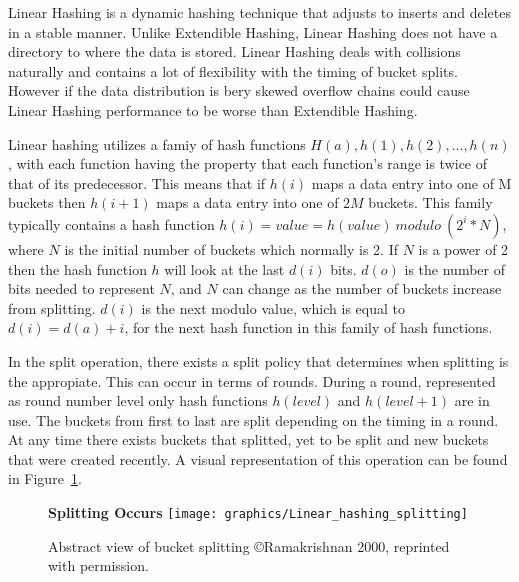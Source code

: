 \documentclass[letterpaper, 12pt]{article}
\begin{document}
Linear Hashing is a dynamic hashing technique that adjusts to inserts and deletes in a stable manner.
Unlike Extendible Hashing, Linear Hashing does not have a directory to where the data is
stored. Linear Hashing deals with collisions naturally and contains a lot of flexibility with
the timing of bucket splits. However if the data distribution is bery skewed overflow chains could cause Linear Hashing performance to be
worse than Extendible Hashing.
\par\vspace{\baselineskip}

Linear hashing utilizes a famiy of hash functions $H(a), h(1), h(2), ... , h(n)$, with each function 
having the property that each function's range is twice of that of its predecessor. This means that 
if $h(i)$ maps a data entry into one of M buckets then $h(i+1)$ maps a data entry into one of $2M$ 
buckets. This family typically contains a hash function $h(i) = value = h(value)\ modulo\ (2^i * N) $, 
where $N$ is the initial number of buckets which normally is 2. If $N$ is a power of 2 then the hash 
function $h$ will look at the last $d(i)$ bits. $d(o)$ is the number of bits needed to represent $N$, 
and $N$ can change as the number of buckets increase from splitting. $d(i)$ is the next modulo value, 
which is equal to $d(i) = d(a)+i$, for the next hash function in this family of hash functions.
\par\vspace{\baselineskip}

In the split operation, there exists a split policy that determines when splitting is the appropiate. 
This can occur in terms of rounds. During a round, represented as round number level only hash 
functions $h(level)$ and $h(level+1)$ are in use. The buckets from first to last are split depending 
on the timing in a round. At any time there exists buckets that splitted, yet to be split and new 
buckets that were created recently. A visual representation of this operation can be found in 
Figure~\ref{fig:lin_hash_split}.
\par\vspace{\baselineskip}

\begin{figure}[H]
  \centering
  \textbf{Splitting Occurs}
  \texttt{[image: graphics/Linear\_hashing\_splitting]}
  \caption{Abstract view of bucket splitting \copyright Ramakrishnan 2000, reprinted with permission.\cite{ramakrishnan2000database}}
  \label{fig:lin_hash_split}
\end{figure}
\end{document}
